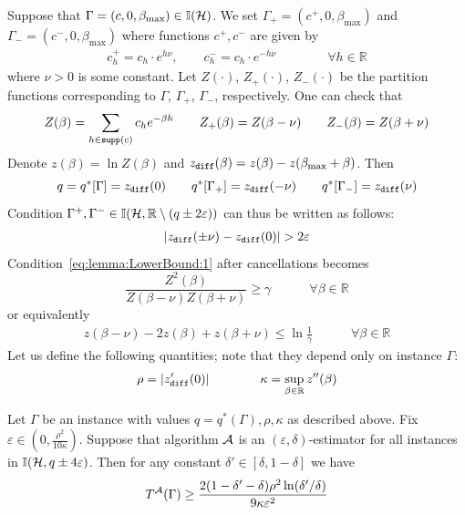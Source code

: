 \documentclass[final,12pt]{colt2018}
\def\myparagraph#1{\vspace{2pt}\noindent{\bf #1~~}}
\def\bmax{{\beta_{\max}}}
\def\calA{{\cal A}}
\def\calH{{\cal H}}
\begin{document}
\myparagraph{Instances $\Gamma_+$ and $\Gamma_-$}
Suppose that $\Gamma=(c,0,\bmax)\in\I(\calH)$.
We set $\Gamma_+=(c^+,0,\bmax)$ and  $\Gamma_-=(c^-,0,\bmax)$ where functions $c^+,c^-$ are given by
\begin{eqnarray*}
c^+_h  =  c_{h}\cdot e^{h\nu},\qquad 
c^-_h  =  c_{h}\cdot e^{-h\nu}\qquad\qquad \forall h\in\mathbb R
\end{eqnarray*}
where $\nu>0$ is some constant.
Let $Z(\cdot)$, $Z_+(\cdot)$, $Z_-(\cdot)$ be the partition functions corresponding to $\Gamma$, $\Gamma_+$, $\Gamma_-$, respectively. One can check that
$$
Z(\beta)=\sum_{h\in{\tt supp}(c)} c_h e^{-\beta h}\qquad Z_+(\beta)=Z(\beta-\nu)\qquad Z_-(\beta)=Z(\beta+\nu)
$$
Denote 
$z(\beta)=\ln Z(\beta)$ and $\zdiff(\beta)=z(\beta)-z(\bmax+\beta)$. Then
$$
q=q^\ast[\Gamma]=z_{\tt diff}(0)\qquad
q^\ast[\Gamma_+]=z_{\tt diff}(-\nu)\qquad
q^\ast[\Gamma_-]=z_{\tt diff}(\nu)
$$
Condition $\Gamma^+,\Gamma^-\in\I(\calH,\mathbb R\setminus(q\pm 2\varepsilon))$ can thus be written as follows:
\begin{eqnarray}
| \zdiff(\pm \nu)- \zdiff(0)|>2\varepsilon
\label{eq:GBAKJSHAKSJGBA}
\end{eqnarray}
Condition~\eqref{eq:lemma:LowerBound:1} after cancellations becomes
$$
\frac{Z^2(\beta)}{Z(\beta-\nu)Z(\beta+\nu)}\ge \gamma\qquad\quad\forall \beta\in\mathbb R
$$
or equivalently
\begin{eqnarray}
z(\beta-\nu)-2z(\beta)+z(\beta+\nu)\le \ln\frac{1}{\gamma} \qquad\quad\forall \beta\in\mathbb R
\label{eq:ALSKGAKSJFAKGA}
\end{eqnarray}
Let us define the following quantities; note that they depend only on instance $\Gamma$:
\begin{equation}
\rho=|z_{\tt diff}'(0)|\qquad\qquad
\kappa=\sup_{\beta\in\mathbb R}z''(\beta)
\end{equation}
\begin{lemma}\label{lemma:LowerBound:2}
Let $\Gamma$ be an instance with values $q=q^\ast(\Gamma),\rho,\kappa$ as described above.
Fix $\varepsilon\in(0,\frac{\rho^2}{10\kappa})$.
Suppose that
 algorithm $\calA$ is an $(\varepsilon,\delta)$-estimator for all instances in $\I(\calH,q\pm 4\varepsilon)$.
Then for any constant $\delta'\in[\delta,1-\delta]$ we have
$$
T^\calA(\Gamma)\ge \frac{2(1-\delta'-\delta)\rho^2\ln (\delta'/\delta)}{9\kappa\varepsilon^2}
$$


\end{lemma}
\end{document}
